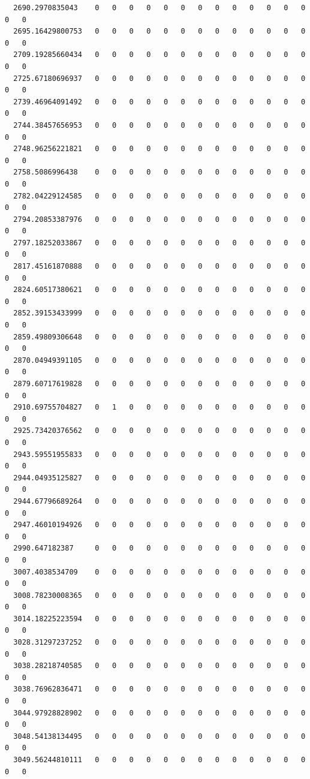 \documentclass[
  letterpaper,
  DIV=11,
  numbers=noendperiod]{scrartcl}
\begin{document}
\begin{verbatim}
  2690.2970835043    0   0   0   0   0   0   0   0   0   0   0   0   0   0   0
  2695.16429800753   0   0   0   0   0   0   0   0   0   0   0   0   0   0   0
  2709.19285660434   0   0   0   0   0   0   0   0   0   0   0   0   0   0   0
  2725.67180696937   0   0   0   0   0   0   0   0   0   0   0   0   0   0   0
  2739.46964091492   0   0   0   0   0   0   0   0   0   0   0   0   0   0   0
  2744.38457656953   0   0   0   0   0   0   0   0   0   0   0   0   0   0   0
  2748.96256221821   0   0   0   0   0   0   0   0   0   0   0   0   0   0   0
  2758.5086996438    0   0   0   0   0   0   0   0   0   0   0   0   0   0   0
  2782.04229124585   0   0   0   0   0   0   0   0   0   0   0   0   0   0   0
  2794.20853387976   0   0   0   0   0   0   0   0   0   0   0   0   0   0   0
  2797.18252033867   0   0   0   0   0   0   0   0   0   0   0   0   0   0   0
  2817.45161870888   0   0   0   0   0   0   0   0   0   0   0   0   0   0   0
  2824.60517380621   0   0   0   0   0   0   0   0   0   0   0   0   0   0   0
  2852.39153433999   0   0   0   0   0   0   0   0   0   0   0   0   0   0   0
  2859.49809306648   0   0   0   0   0   0   0   0   0   0   0   0   0   0   0
  2870.04949391105   0   0   0   0   0   0   0   0   0   0   0   0   0   0   0
  2879.60717619828   0   0   0   0   0   0   0   0   0   0   0   0   0   0   0
  2910.69755704827   0   1   0   0   0   0   0   0   0   0   0   0   0   0   0
  2925.73420376562   0   0   0   0   0   0   0   0   0   0   0   0   0   0   0
  2943.59551955833   0   0   0   0   0   0   0   0   0   0   0   0   0   0   0
  2944.04935125827   0   0   0   0   0   0   0   0   0   0   0   0   0   0   0
  2944.67796689264   0   0   0   0   0   0   0   0   0   0   0   0   0   0   0
  2947.46010194926   0   0   0   0   0   0   0   0   0   0   0   0   0   0   0
  2990.647182387     0   0   0   0   0   0   0   0   0   0   0   0   0   0   0
  3007.4038534709    0   0   0   0   0   0   0   0   0   0   0   0   0   0   0
  3008.78230008365   0   0   0   0   0   0   0   0   0   0   0   0   0   0   0
  3014.18225223594   0   0   0   0   0   0   0   0   0   0   0   0   0   0   0
  3028.31297237252   0   0   0   0   0   0   0   0   0   0   0   0   0   0   0
  3038.28218740585   0   0   0   0   0   0   0   0   0   0   0   0   0   0   0
  3038.76962836471   0   0   0   0   0   0   0   0   0   0   0   0   0   0   0
  3044.97928828902   0   0   0   0   0   0   0   0   0   0   0   0   0   0   0
  3048.54138134495   0   0   0   0   0   0   0   0   0   0   0   0   0   0   0
  3049.56244810111   0   0   0   0   0   0   0   0   0   0   0   0   0   0   0

\end{verbatim}
\end{document}
